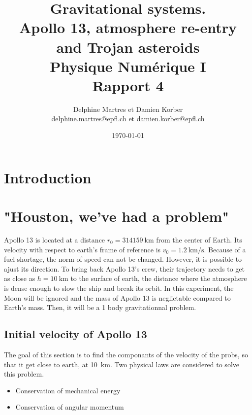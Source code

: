 \documentclass[a4paper,12pt,twoside]{article}
\newcommand{\mail}[1]{{\href{mailto:#1}{#1}}}
\begin{document}
\title{Gravitational systems.\\{\small Apollo 13, atmosphere re-entry and Trojan asteroids \\ Physique Numérique I}\\{\small Rapport 4}}
\date{\today}
\author{Delphine Martres et Damien Korber\\{\small \mail{delphine.martres@epfl.ch} et \mail{damien.korber@epfl.ch}}}
\maketitle
\tableofcontents %

\baselineskip=16pt
\parindent=15pt
\parskip=5pt
\newpage



\section{Introduction}

\section{"Houston, we've had a problem"}
Apollo 13 is located at a distance $r_0 = \SI{314159}{\kilo\meter}$ from the center of Earth.
Its velocity with respect to earth's frame of reference is $v_0 = \SI{1.2}{\kilo\meter\per\second}$.
Because of a fuel shortage, the norm of speed can not be changed.
However, it is possible to ajust its direction.
To bring back Apollo 13's crew, their trajectory needs to get as close as $h=\SI{10}{\kilo\meter}$ to the surface of earth, the distance where the atmosphere is dense enough to slow the ship and break its orbit.
In this experiment, the Moon will be ignored and the mass of Apollo 13 is neglictable compared to Earth's mass. Then, it will be a 1 body gravitationnal problem.

\subsection{Initial velocity of Apollo 13}
The goal of this section is to find the componants of the velocity of the probs, so that it get close to earth, at \SI{10}{\kilo\meter}.
Two physical laws are considered to solve this problem. %
\begin{itemize}
  \item Conservation of mechanical energy
  \item Conservation of angular momentum
\end{itemize}
\end{document}
